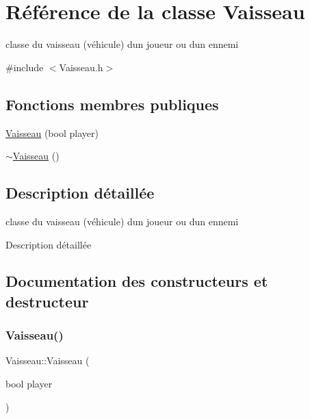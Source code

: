 \hypertarget{class_vaisseau}{}\section{Référence de la classe Vaisseau}
\label{class_vaisseau}


classe du vaisseau (véhicule) d\textquotesingle{}un joueur ou d\textquotesingle{}un ennemi  




{\ttfamily \#include $<$Vaisseau.\+h$>$}

\subsection*{Fonctions membres publiques}
\begin{DoxyCompactItemize}
\item 
\hyperlink{class_vaisseau_a7a6f829d62d9a0568c0c10d42c81bd47}{Vaisseau} (bool player)
\item 
\hyperlink{class_vaisseau_ae40b8e0143d6b736065207281bde2e8a}{$\sim$\+Vaisseau} ()
\end{DoxyCompactItemize}


\subsection{Description détaillée}
classe du vaisseau (véhicule) d\textquotesingle{}un joueur ou d\textquotesingle{}un ennemi 

Description détaillée 

\subsection{Documentation des constructeurs et destructeur}
\mbox{\label{class_vaisseau_a7a6f829d62d9a0568c0c10d42c81bd47}} 
\subsubsection{\texorpdfstring{Vaisseau()}{Vaisseau()}}
{\footnotesize\ttfamily Vaisseau\+::\+Vaisseau (\begin{DoxyParamCaption}\item[{bool}]{player }\end{DoxyParamCaption})\hspace{0.3cm}{\ttfamily [explicit]}}


